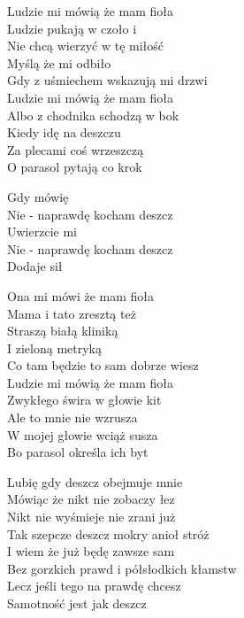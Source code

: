 \begin{text}
    \hfill\break
    Ludzie mi mówią że mam fioła\\
    Ludzie pukają w czoło i\\
    Nie chcą wierzyć w tę miłość\\
    Myślą że mi odbiło\\
    Gdy z uśmiechem wskazują mi drzwi\\
    Ludzie mi mówią że mam fioła\\
    Albo z chodnika schodzą w bok\\
    Kiedy idę na deszczu\\
    Za plecami coś wrzeszczą\\
    O parasol pytają co krok

    Gdy mówię\\
    Nie - naprawdę kocham deszcz\\
    Uwierzcie mi\\
    Nie - naprawdę kocham deszcz\\
    Dodaje sił

    Ona mi mówi że mam fioła\\
    Mama i tato zresztą też\\
    Straszą białą kliniką\\
    I zieloną metryką\\
    Co tam będzie to sam dobrze wiesz\\
    Ludzie mi mówią że mam fioła\\
    Zwykłego świra w głowie kit\\
    Ale to mnie nie wzrusza\\
    W mojej głowie wciąż susza\\
    Bo parasol określa ich byt

    Lubię gdy deszcz obejmuje mnie\\
    Mówiąc że nikt nie zobaczy łez\\
    Nikt nie wyśmieje nie zrani już\\
    Tak szepcze deszcz mokry anioł stróż\\
    I wiem że już będę zawsze sam\\
    Bez gorzkich prawd i półsłodkich kłamstw\\
    Lecz jeśli tego na prawdę chcesz\\
    Samotność jest jak deszcz
\end{text}
